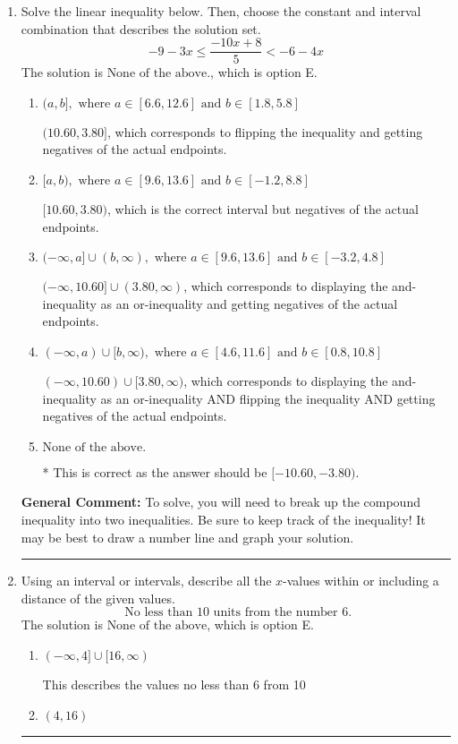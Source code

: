 \documentclass{extbook}[14pt]
\newcommand{\litem}[1]{\item #1

\rule{\textwidth}{0.4pt}}
\begin{document}
\begin{enumerate}\litem{
Solve the linear inequality below. Then, choose the constant and interval combination that describes the solution set.
\[ -9 - 3 x \leq \frac{-10 x + 8}{5} < -6 - 4 x \]
The solution is \( \text{None of the above.} \), which is option E.\begin{enumerate}[label=\Alph*.]
\item \( (a, b], \text{ where } a \in [6.6, 12.6] \text{ and } b \in [1.8, 5.8] \)

$(10.60, 3.80]$, which corresponds to flipping the inequality and getting negatives of the actual endpoints.
\item \( [a, b), \text{ where } a \in [9.6, 13.6] \text{ and } b \in [-1.2, 8.8] \)

$[10.60, 3.80)$, which is the correct interval but negatives of the actual endpoints.
\item \( (-\infty, a] \cup (b, \infty), \text{ where } a \in [9.6, 13.6] \text{ and } b \in [-3.2, 4.8] \)

$(-\infty, 10.60] \cup (3.80, \infty)$, which corresponds to displaying the and-inequality as an or-inequality and getting negatives of the actual endpoints.
\item \( (-\infty, a) \cup [b, \infty), \text{ where } a \in [4.6, 11.6] \text{ and } b \in [0.8, 10.8] \)

$(-\infty, 10.60) \cup [3.80, \infty)$, which corresponds to displaying the and-inequality as an or-inequality AND flipping the inequality AND getting negatives of the actual endpoints.
\item \( \text{None of the above.} \)

* This is correct as the answer should be $[-10.60, -3.80)$.
\end{enumerate}

\textbf{General Comment:} To solve, you will need to break up the compound inequality into two inequalities. Be sure to keep track of the inequality! It may be best to draw a number line and graph your solution.
}
\litem{
Using an interval or intervals, describe all the $x$-values within or including a distance of the given values.
\[ \text{ No less than } 10 \text{ units from the number } 6. \]
The solution is \( \text{None of the above} \), which is option E.\begin{enumerate}[label=\Alph*.]
\item \( (-\infty, 4] \cup [16, \infty) \)

This describes the values no less than 6 from 10
\item \( (4, 16) \)


\end{enumerate}}
\end{enumerate}
\end{document}
